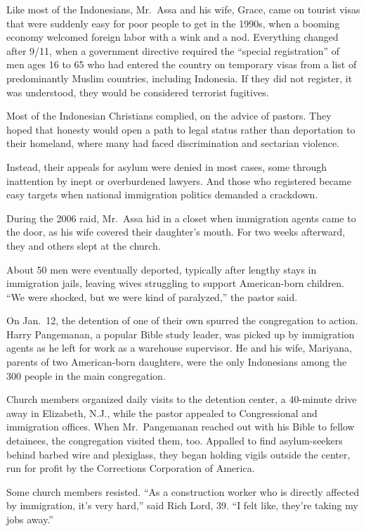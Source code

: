 ﻿\documentclass[12pt]{article}
\begin{document}
Like most of the Indonesians, Mr.~Assa and his wife, Grace, came on tourist visas that were suddenly
easy for poor people to get in the 1990s, when a booming economy welcomed foreign labor with a wink
and a nod. Everything changed after 9/11, when a government directive required the ``special
registration'' of men ages 16 to 65 who had entered the country on temporary visas from a list of
predominantly Muslim countries, including Indonesia. If they did not register, it was understood,
they would be considered terrorist fugitives.

Most of the Indonesian Christians complied, on the advice of pastors. They hoped that honesty would
open a path to legal status rather than deportation to their homeland, where many had faced
discrimination and sectarian violence.

Instead, their appeals for asylum were denied in most cases, some through inattention by inept or
overburdened lawyers. And those who registered became easy targets when national immigration
politics demanded a crackdown.

During the 2006 raid, Mr.~Assa hid in a closet when immigration agents came to the door, as his wife
covered their daughter's mouth. For two weeks afterward, they and others slept at the church.

About 50 men were eventually deported, typically after lengthy stays in immigration jails, leaving
wives struggling to support American-born children. ``We were shocked, but we were kind of
paralyzed,'' the pastor said.

On Jan.~12, the detention of one of their own spurred the congregation to action. Harry Pangemanan,
a popular Bible study leader, was picked up by immigration agents as he left for work as a warehouse
supervisor. He and his wife, Mariyana, parents of two American-born daughters, were the only
Indonesians among the 300 people in the main congregation.

Church members organized daily visits to the detention center, a 40-minute drive away in Elizabeth,
N.J., while the pastor appealed to Congressional and immigration offices. When Mr.~Pangemanan
reached out with his Bible to fellow detainees, the congregation visited them, too. Appalled to find
asylum-seekers behind barbed wire and plexiglass, they began holding vigils outside the center, run
for profit by the Corrections Corporation of America.

Some church members resisted. ``As a construction worker who is directly affected by immigration,
it's very hard,'' said Rich Lord, 39. ``I felt like, they're taking my jobs away.''
\end{document}
